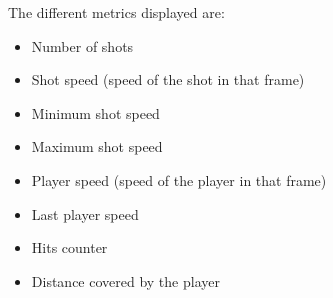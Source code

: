 The different metrics displayed are:
\begin{itemize}
    \item Number of shots
    \item Shot speed (speed of the shot in that frame)
    \item Minimum shot speed
    \item Maximum shot speed
    \item Player speed (speed of the player in that frame)
    \item Last player speed
    \item Hits counter
    \item Distance covered by the player
\end{itemize}


